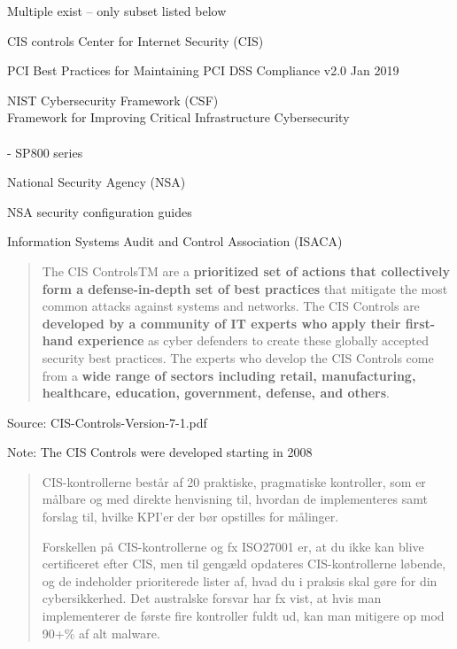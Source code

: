 \documentclass[Screen16to9,17pt]{foils}
\begin{document}
\begin{list1}
\item Multiple exist -- only subset listed below
\vskip 1cm
\begin{list2}
\item CIS controls Center for Internet Security (CIS) 
\item PCI Best Practices for Maintaining PCI DSS Compliance v2.0 Jan 2019
\item NIST Cybersecurity Framework (CSF)\\
Framework for Improving
Critical Infrastructure Cybersecurity\\ \\
 - SP800 series
\item National Security Agency (NSA)\\
\item NSA security configuration guides\\
\item Information Systems Audit and Control Association (ISACA)\\
\end{list2}
\end{list1}



\begin{quote}
The CIS ControlsTM are a  {\bf prioritized set of actions that collectively form a defense-in-depth set of best practices} that mitigate the most common attacks against systems and networks. The CIS Controls are {\bf developed by a community of IT experts who apply their first-hand experience} as cyber defenders to create these globally accepted security best practices. The experts who develop the CIS Controls come from a {\bf wide range of sectors including retail, manufacturing, healthcare, education, government, defense, and others}.
\end{quote}

Source:  CIS-Controls-Version-7-1.pdf

Note: The CIS Controls were developed starting in 2008



\begin{quote}
CIS-kontrollerne består af 20 praktiske, pragmatiske kontroller, som er målbare og med direkte henvisning til, hvordan de implementeres samt forslag til, hvilke KPI’er der bør opstilles for målinger.

Forskellen på CIS-kontrollerne og fx ISO27001 er, at du ikke kan blive certificeret efter CIS, men til gengæld opdateres CIS-kontrollerne løbende, og de indeholder prioriterede lister af, hvad du i praksis skal gøre for din cybersikkerhed. Det australske forsvar har fx vist, at hvis man implementerer de første fire kontroller fuldt ud, kan man mitigere op mod 90+\% af alt malware.
\end{quote}
\end{document}
